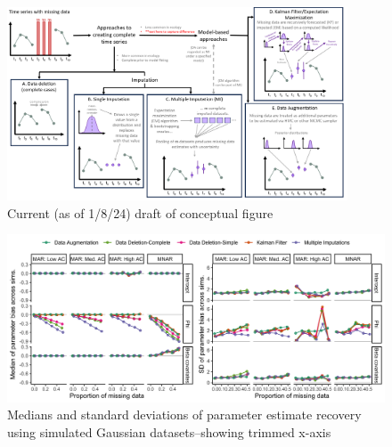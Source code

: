 \documentclass{article}
\begin{document}
 
\begin{figure}[h]
     \noindent\includegraphics[width = 0.9\textwidth]{Figures/ConceptualFigure.png}
     \caption{Current (as of 1/8/24) draft of conceptual figure}
     \label{fig:ConceptualFigure}
 \end{figure}



\begin{figure}
    \noindent\includegraphics[width = \textwidth]{Figures/parameterRecovery_sim_Guassian_medsSD_trimmed.png}
    \caption{Medians and standard deviations of parameter estimate recovery using simulated Gaussian datasets--showing trimmed x-axis}
    \label{fig:ParamRec_Gauss}
\end{figure}
\end{document}
